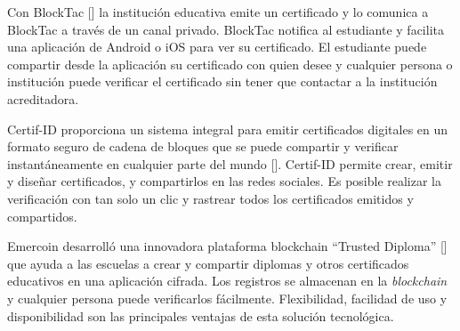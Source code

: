 

Con BlockTac [\cite{83}] la institución educativa emite un certificado y lo comunica a BlockTac a través de un canal privado. BlockTac notifica al estudiante y facilita una aplicación de Android o iOS para ver su certificado. El estudiante puede compartir desde la aplicación su certificado con quien desee y cualquier persona o institución puede verificar el certificado sin tener que contactar a la institución acreditadora.

%
Certif-ID proporciona un sistema integral para emitir certificados digitales en un formato seguro de cadena de bloques que se puede compartir y verificar instantáneamente en cualquier parte del mundo [\cite{84}]. Certif-ID permite crear, emitir y diseñar certificados, y compartirlos en las redes sociales. Es posible realizar la verificación con tan solo un clic y  rastrear todos los certificados emitidos y compartidos.


Emercoin desarrolló una innovadora plataforma blockchain ``Trusted Diploma'' [\cite{87}] que ayuda a las escuelas a crear y compartir diplomas y otros certificados educativos en una aplicación cifrada. Los registros se almacenan en la \textit{blockchain} y cualquier persona puede verificarlos fácilmente. Flexibilidad, facilidad de uso y disponibilidad son las principales ventajas de esta solución tecnológica.

